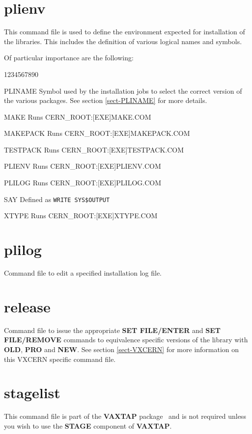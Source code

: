 \section{plienv}

This command file is used to define the environment expected for
installation of the libraries. This includes the definition
of various logical names and symbols.

Of particular importance are the following:

\begin{DLtt}{1234567890}
\item[PLINAME]Symbol used by the installation jobs to select the correct
version of the various packages. See section \ref{sect-PLINAME} for more
details.
\item[MAKE]Runs CERN\_ROOT:[EXE]MAKE.COM
\item[MAKEPACK]Runs CERN\_ROOT:[EXE]MAKEPACK.COM
\item[TESTPACK]Runs CERN\_ROOT:[EXE]TESTPACK.COM
\item[PLIENV]Runs CERN\_ROOT:[EXE]PLIENV.COM
\item[PLILOG]Runs CERN\_ROOT:[EXE]PLILOG.COM\\
\item[SAY]Defined as {\tt WRITE SYS\$OUTPUT}
\item[XTYPE]Runs CERN\_ROOT:[EXE]XTYPE.COM
\end{DLtt}

\section{plilog}

Command file to edit a specified installation log file.

\section{release}

Command file to issue the appropriate {\bf SET FILE/ENTER} and
{\bf SET FILE/REMOVE} commands to equivalence specific versions
of the library with {\bf OLD}, {\bf PRO} and {\bf NEW}.
See section \ref{sect-VXCERN} for more information on this 
VXCERN specific command file.

\section{stagelist}

This command file is part of the {\bf VAXTAP} package~\cite{bib-VAXTAP}
and is not required unless you wish to use the {\bf STAGE} component
of {\bf VAXTAP}.

